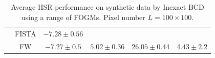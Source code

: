 \begin{table}[h]
{\begin{tabular}{|c|c|c|c|c|c|}
                    & FISTA  &                   {$-7.28\pm 0.56$} & \cellcolor{red!10}{$3.93\pm 0.48$} & \cellcolor{red!10}{$28.49\pm 1.17$} & \cellcolor{red!10}{$4.41\pm 2.14$}  \tabularnewline
                    & FW     &                   {$-7.27\pm 0.5$}  &                   {$5.02\pm 0.36$} &                   {$26.05\pm 0.44$} &                   {$4.43\pm 2.2$}   \tabularnewline \hline
\end{tabular}
}
\caption{Average HSR performance on synthetic data by Inexact BCD using a
         range of FOGMs. Pixel number $L = 100 \times 100$.}
\label{table:ALGO_GP_BB_PG_FISTA_FW_vs_SYNT_MO9_MO16}
\end{table}

